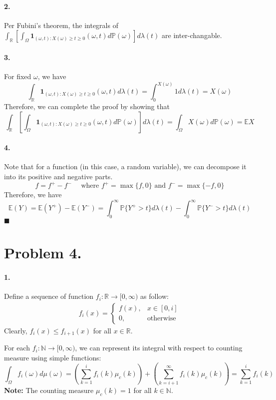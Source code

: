 \documentclass[11pt]{article}
\theoremstyle{definition}
\theoremstyle{boldtitle} %
\numberwithin{equation}{section}
\numberwithin{figure}{section}
\numberwithin{table}{section}
\begin{document}
\paragraph{2.} 
Per Fubini's theorem, the integrals of $\int_{\mathbb{R}} \left[ \int_\Omega \bm{1}_{(\omega, t): X(\omega) \geq t \geq 0}(\omega, t) d \mathbb{P}(\omega) \right] d \lambda(t)$
are inter-changable.

\paragraph{3.} 
For fixed $\omega$, we have 
\[
\int_{\mathbb{R}} \bm{1}_{(\omega, t): X(\omega) \geq t \geq 0}(\omega, t) d \lambda (t) = \int_0^{X(\omega)} 1 d \lambda(t) = X(\omega)
\]
Therefore, we can complete the proof by showing that 
\[
\int_{\mathbb{R}} \left[ \int_\Omega \bm{1}_{(\omega, t): X(\omega) \geq t \geq 0}(\omega, t) d \mathbb{P}(\omega) \right] d \lambda(t) = \int_\Omega X(\omega) d \mathbb{P}(\omega) = \mathbb{E}X
\]


\paragraph{4.} 
Note that for a function (in this case, a random variable), we can decompose it into its positive and negative parts.
\[
f = f^+ - f^- \quad \text{ where } f^+ = \max\{f, 0\} \text{ and } f^- = \max\{-f, 0\}
\]
Therefore, we have
\[
\mathbb{E}(Y) = \mathbb{E}(Y^+) - \mathbb{E}(Y^-) = \int_0^\infty \mathbb{P}\{ Y^+ > t \} d\lambda(t) - \int_0^\infty \mathbb{P}\{ Y^- > t \} d\lambda(t)
\]
\(\blacksquare\)

\section*{Problem 4.}
\paragraph{1.} Define a sequence of function $f_i: \mathbb{R} \rightarrow [0, \infty)$ as follow:
\begin{align}
    f_i(x) =
    \begin{cases}
    f(x), & x \in [0, i] \\
    0, & \text{otherwise}
    \end{cases}
\end{align}
Clearly, $f_i(x) \leq f_{i+1}(x)$ for all $x \in \mathbb{R}$.

For each $f_i: \mathbb{N} \rightarrow [0, \infty)$, 
we can represent its integral with respect to counting measure using simple functions:
\begin{equation}
    \int_\Omega f_i(\omega) d\mu(\omega) = \left(\sum_{k=1}^i f_i(k) \mu_c(k) \right) + \left(\sum_{k=i+1}^\infty f_i(k) \mu_c(k) \right) = \sum_{k=1}^i f_i(k)
\end{equation}
\textbf{Note:} The counting measure $\mu_c(k) = 1$ for all $k \in \mathbb{N}$.
\end{document}
